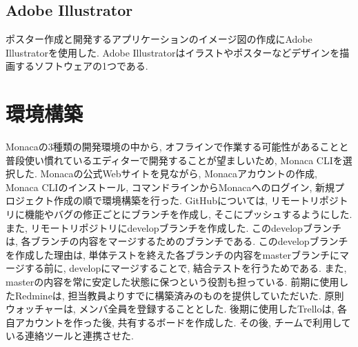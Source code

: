 \subsection{Adobe Illustrator}%
ポスター作成と開発するアプリケーションのイメージ図の作成にAdobe Illustratorを使用した. Adobe Illustratorはイラストやポスターなどデザインを描画するソフトウェアの1つである.


\section{環境構築}%
Monacaの3種類の開発環境の中から, オフラインで作業する可能性があることと普段使い慣れているエディターで開発することが望ましいため, Monaca CLIを選択した. Monacaの公式Webサイト\cite{tutorial_monaca_CLI}を見ながら, Monacaアカウントの作成, Monaca CLIのインストール, コマンドラインからMonacaへのログイン, 新規プロジェクト作成の順で環境構築を行った. GitHubについては, リモートリポジトリに機能やバグの修正ごとにブランチを作成し, そこにプッシュするようにした. また, リモートリポジトリにdevelopブランチを作成した. このdevelopブランチは, 各ブランチの内容をマージするためのブランチである. このdevelopブランチを作成した理由は, 単体テストを終えた各ブランチの内容をmasterブランチにマージする前に, developにマージすることで, 結合テストを行うためである. また, masterの内容を常に安定した状態に保つという役割も担っている. 前期に使用したRedmineは, 担当教員よりすでに構築済みのものを提供していただいた. 原則ウォッチャー\cite{Redmine}は, メンバ全員を登録することとした. 後期に使用したTrelloは, 各自アカウントを作った後, 共有するボードを作成した. その後, チームで利用している連絡ツールと連携させた.

